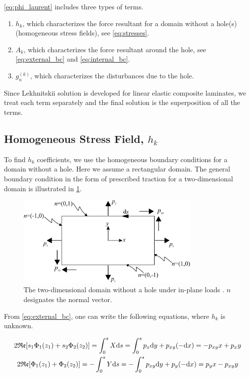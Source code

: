 \documentclass{article}
\begin{document}
\cref{eq:phi_laurent} includes three types of terms.

\begin{enumerate}
    \item $h_k$, which characterizes the force resultant for a domain without a hole(s) (homogeneous stress fields), see \cref{eq:stresses}.
    \item $A_k$, which characterizes the force resultant around the hole, see \cref{eq:external_bc} and \cref{eq:internal_bc}. 
    \item $g_n^{(k)}$, which characterizes the disturbances due to the hole.
\end{enumerate}

Since Lekhnitskii solution is developed for linear elastic composite laminates, we treat each term separately and the final solution is the superposition of all the terms.

\subsection{Homogeneous Stress Field, \texorpdfstring{$h_k$}{}}
To find $h_k$ coefficients, we use the homogeneous boundary conditions for a domain without a hole. Here we assume a rectangular domain. The general boundary condition in the form of prescribed traction for a two-dimensional domain is illustrated in \cref{fig:domain_h_k}. \\

\begin{figure}[ht]
    \centering
    \includegraphics[width = 0.8\textwidth ]{figures/h_k.pdf}
    \caption{The two-dimensional domain without a hole under in-plane loads \cite{Koussios2009}. $n$ designates the normal vector.}
    \label{fig:domain_h_k}
\end{figure}

From \cref{eq:external_bc}, one can write the following equations, where $h_k$ is unknown.

\begin{gather}
    2 \mathfrak{Re}[s_1 \Phi_1(z_1) + s_2 \Phi_2(z_2)] = \int_{0}^{s}{X \mathrm{d}s} = \int_{0}^{s}{p_{x} \mathrm{d}y + p_{xy} (-\mathrm{d}x)} = -p_{xy} x + p_x y \notag \\
    2 \mathfrak{Re}[\Phi_1(z_1) + \Phi_2(z_2)] = -\int_{0}^{s}{Y \mathrm{d}s} = -\int_{0}^{s}{p_{xy} \mathrm{d}y + p_y (-\mathrm{d}x)} = p_y x - p_{xy} y  
    \label{eq:resultant_h_k}
\end{gather}
\end{document}
